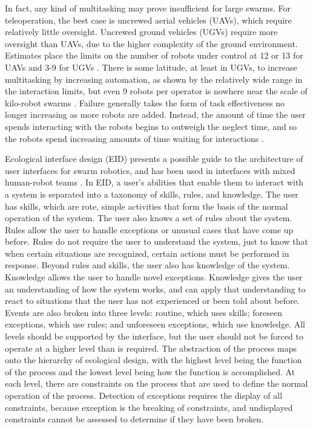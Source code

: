 \documentclass[]{article}
\begin{document}
In fact, any kind of multitasking may prove insufficient for large swarms. 
For teleoperation, the best case is uncrewed aerial vehicles (UAVs), which require relatively little oversight. 
Uncrewed ground vehicles (UGVs) require more oversight than UAVs, due to the higher complexity of the ground environment. 
Estimates place the limits on the number of robots under control at 12 or 13 for UAVs and 3-9 for UGVs \cite{WangSearchScale}.  
There is some latitude, at least in UGVs, to increase multitasking by increasing automation, as shown by the relatively wide range in the interaction limits, but even 9 robots per operator is nowhere near the scale of kilo-robot swarms  \cite{Olsen:2004:FMH:985692.985722}.
Failure generally takes the form of task effectiveness no longer increasing as more robots are added.
Instead, the amount of time the user spends interacting with the robots begins to outweigh the neglect time, and so the robots spend increasing amounts of time waiting for interactions \cite{cummings2008predicting}. 

Ecological interface design (EID) presents a possible guide to the architecture of user interfaces for swarm robotics, and has been used in interfaces with mixed human-robot teams \cite{vicente1992ecological, gancet2010user}. 
In EID, a user's abilities that enable them to interact with a system is separated into a taxonomy of skills, rules, and knowledge. 
The user has skills, which are rote, simple activities that form the basis of the normal operation of the system. 
The user also knows a set of rules about the system. 
Rules allow the user to handle exceptions or unusual cases that have come up before. 
Rules do not require the user to understand the system, just to know that when certain situations are recognized, certain actions must be performed in response. 
Beyond rules and skills, the user also has knowledge of the system. 
Knowledge allows the user to handle novel exceptions. 
Knowledge gives the user an understanding of how the system works, and can apply that understanding to react to situations that the user has not experienced or been told about before. 
Events are also broken into three levels: routine, which uses skills; foreseen exceptions, which use rules; and unforeseen exceptions, which use knowledge. 
All levels should be supported by the interface, but the user should not be forced to operate at a higher level than is required. 
The abstraction of the process maps onto the hierarchy of ecological design, with the highest level being the function of the process and the lowest level being how the function is accomplished. 
At each level, there are constraints on the process that are used to define the normal operation of the process.
Detection of exceptions requires the display of all constraints, because exception is the breaking of constraints, and undisplayed constraints cannot be assessed to determine if they have been broken.
\end{document}
